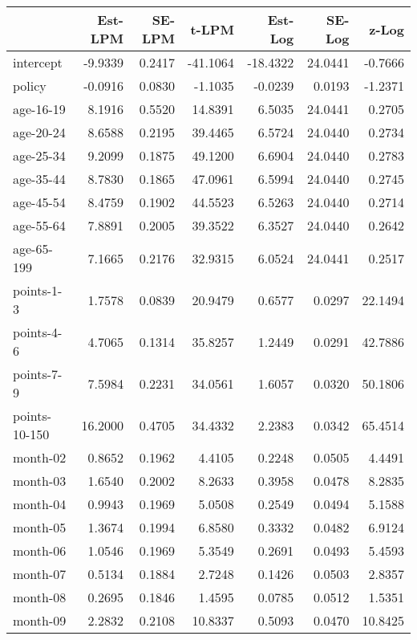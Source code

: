 \documentclass[10pt]{article}
\begin{document}
\begin{table}[ht]
\centering
\begin{tabular}{lrrrrrr}
  \hline
 & Est-LPM & SE-LPM & t-LPM & Est-Log & SE-Log & z-Log \\ 
  \hline
intercept & -9.9339 & 0.2417 & -41.1064 & -18.4322 & 24.0441 & -0.7666 \\ 
  policy & -0.0916 & 0.0830 & -1.1035 & -0.0239 & 0.0193 & -1.2371 \\ 
  age-16-19 & 8.1916 & 0.5520 & 14.8391 & 6.5035 & 24.0441 & 0.2705 \\ 
  age-20-24 & 8.6588 & 0.2195 & 39.4465 & 6.5724 & 24.0440 & 0.2734 \\ 
  age-25-34 & 9.2099 & 0.1875 & 49.1200 & 6.6904 & 24.0440 & 0.2783 \\ 
  age-35-44 & 8.7830 & 0.1865 & 47.0961 & 6.5994 & 24.0440 & 0.2745 \\ 
  age-45-54 & 8.4759 & 0.1902 & 44.5523 & 6.5263 & 24.0440 & 0.2714 \\ 
  age-55-64 & 7.8891 & 0.2005 & 39.3522 & 6.3527 & 24.0440 & 0.2642 \\ 
  age-65-199 & 7.1665 & 0.2176 & 32.9315 & 6.0524 & 24.0441 & 0.2517 \\ 
  points-1-3 & 1.7578 & 0.0839 & 20.9479 & 0.6577 & 0.0297 & 22.1494 \\ 
  points-4-6 & 4.7065 & 0.1314 & 35.8257 & 1.2449 & 0.0291 & 42.7886 \\ 
  points-7-9 & 7.5984 & 0.2231 & 34.0561 & 1.6057 & 0.0320 & 50.1806 \\ 
  points-10-150 & 16.2000 & 0.4705 & 34.4332 & 2.2383 & 0.0342 & 65.4514 \\ 
  month-02 & 0.8652 & 0.1962 & 4.4105 & 0.2248 & 0.0505 & 4.4491 \\ 
  month-03 & 1.6540 & 0.2002 & 8.2633 & 0.3958 & 0.0478 & 8.2835 \\ 
  month-04 & 0.9943 & 0.1969 & 5.0508 & 0.2549 & 0.0494 & 5.1588 \\ 
  month-05 & 1.3674 & 0.1994 & 6.8580 & 0.3332 & 0.0482 & 6.9124 \\ 
  month-06 & 1.0546 & 0.1969 & 5.3549 & 0.2691 & 0.0493 & 5.4593 \\ 
  month-07 & 0.5134 & 0.1884 & 2.7248 & 0.1426 & 0.0503 & 2.8357 \\ 
  month-08 & 0.2695 & 0.1846 & 1.4595 & 0.0785 & 0.0512 & 1.5351 \\ 
  month-09 & 2.2832 & 0.2108 & 10.8337 & 0.5093 & 0.0470 & 10.8425 \\ 

\end{tabular}
\end{table}
\end{document}
